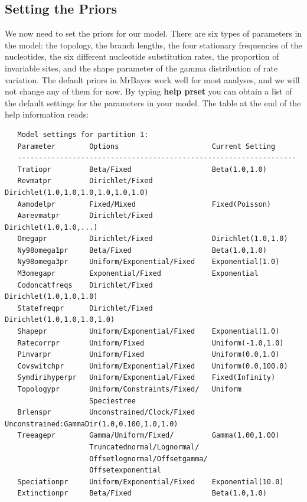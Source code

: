 \documentclass[12pt]{book}
\begin{document}
\subsection{Setting the Priors}
We now need to set the priors for our model. There are six types of parameters in the model: the
topology, the branch lengths, the four stationary frequencies of the nucleotides, the six different
nucleotide substitution rates, the proportion of invariable sites, and the shape parameter of the
gamma distribution of rate variation. The default priors in MrBayes work well for most analyses,
and we will not change any of them for now. By typing \textbf{help prset} you can obtain a list of
the default settings for the parameters in your model. The table at the end of the help information
reads:

\begin{singlespacing}
\small
\begin{verbatim}
   Model settings for partition 1:
   Parameter        Options                      Current Setting
   ------------------------------------------------------------------
   Tratiopr         Beta/Fixed                   Beta(1.0,1.0)
   Revmatpr         Dirichlet/Fixed              Dirichlet(1.0,1.0,1.0,1.0,1.0,1.0)
   Aamodelpr        Fixed/Mixed                  Fixed(Poisson)
   Aarevmatpr       Dirichlet/Fixed              Dirichlet(1.0,1.0,...)
   Omegapr          Dirichlet/Fixed              Dirichlet(1.0,1.0)
   Ny98omega1pr     Beta/Fixed                   Beta(1.0,1.0)
   Ny98omega3pr     Uniform/Exponential/Fixed    Exponential(1.0)
   M3omegapr        Exponential/Fixed            Exponential
   Codoncatfreqs    Dirichlet/Fixed              Dirichlet(1.0,1.0,1.0)
   Statefreqpr      Dirichlet/Fixed              Dirichlet(1.0,1.0,1.0,1.0)
   Shapepr          Uniform/Exponential/Fixed    Exponential(1.0)
   Ratecorrpr       Uniform/Fixed                Uniform(-1.0,1.0)
   Pinvarpr         Uniform/Fixed                Uniform(0.0,1.0)
   Covswitchpr      Uniform/Exponential/Fixed    Uniform(0.0,100.0)
   Symdirihyperpr   Uniform/Exponential/Fixed    Fixed(Infinity)
   Topologypr       Uniform/Constraints/Fixed/   Uniform
                    Speciestree
   Brlenspr         Unconstrained/Clock/Fixed    Unconstrained:GammaDir(1.0,0.100,1.0,1.0)
   Treeagepr        Gamma/Uniform/Fixed/         Gamma(1.00,1.00)
                    Truncatednormal/Lognormal/
                    Offsetlognormal/Offsetgamma/
                    Offsetexponential
   Speciationpr     Uniform/Exponential/Fixed    Exponential(10.0)
   Extinctionpr     Beta/Fixed                   Beta(1.0,1.0)

\end{verbatim}
\end{singlespacing}
\end{document}
